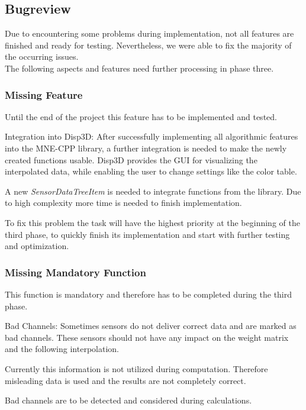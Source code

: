 \subsection{Bugreview} \label{bugreview}
Due to encountering some problems during implementation, not all features are finished and ready for testing.
Nevertheless, we were able to fix the majority of the occurring issues. \\ 
The following aspects and features need further processing in phase three. 

\subsubsection{Missing Feature}
Until the end of the project this feature has to be implemented and tested.

\begin{aims}
	\item[\hspace*{11mm} Integration into Disp3D:] After successfully implementing all algorithmic features into the MNE-CPP library, a further integration is needed to make the newly created functions usable. Disp3D provides the GUI for visualizing the interpolated data, while enabling the user to change settings like the color table.
	
	A new \textit{SensorDataTreeItem} is needed to integrate functions from the library. Due to high complexity more time is needed to finish implementation.
	
	To fix this problem the task will have the highest priority at the beginning of the third phase, to quickly finish its implementation and start with further testing and optimization. 
	
	
\end{aims}

\subsubsection{Missing Mandatory Function} \label{badChannel}
This function is mandatory and therefore has to be completed during the third phase. 

\begin{aims}
	\item[\hspace*{11mm} Bad Channels:]Sometimes sensors do not deliver correct data and are marked as bad channels. These sensors should not have                          					   any impact on the weight matrix and the following interpolation. 
	
					   Currently this information is not utilized during computation. Therefore misleading data is used and the 							   results are not completely correct.  
					  
					   Bad channels are to be detected and considered during calculations. 
\end{aims}

